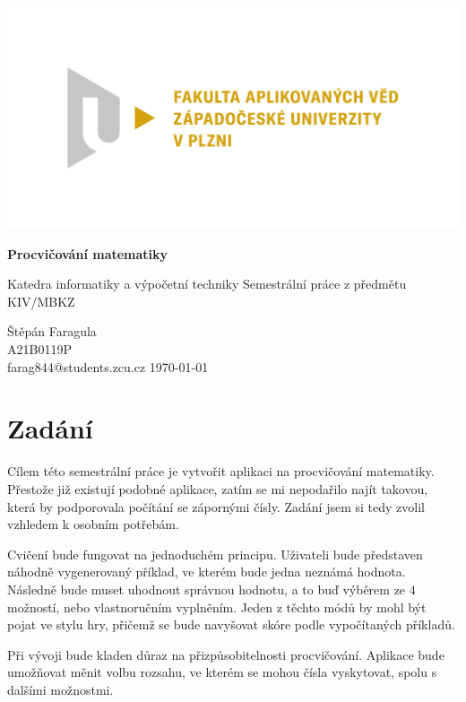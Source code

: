 \documentclass[12pt]{report}
\begin{document}
	\begin{titlepage}
		\centering
		\Large
		
		\includegraphics[width=.7\textwidth]{fav}
		
		\vspace{15mm}
		{\Huge\bfseries Procvičování matematiky}

		\vspace{5mm}
		{\LARGE Katedra informatiky a výpočetní techniky}
		{\LARGE Semestrální práce z předmětu KIV/MBKZ}
		
		\vfill
		\raggedright
		Štěpán Faragula\\
		A21B0119P\\
		farag844@students.zcu.cz
		\hfill 
		\today
	\end{titlepage}

	
	\tableofcontents


	\chapter{Zadání}
	Cílem této semestrální práce je vytvořit aplikaci na procvičování matematiky. Přestože již existují podobné aplikace, zatím se mi nepodařilo najít takovou, která by podporovala počítání se zápornými čísly. Zadání jsem si tedy zvolil vzhledem k osobním potřebám.
	
	Cvičení bude fungovat na jednoduchém principu. Uživateli bude představen náhodně vygenerovaný příklad, ve kterém bude jedna neznámá hodnota. Následně bude muset uhodnout správnou hodnotu, a to buď výběrem ze 4 možností, nebo vlastnoručním vyplněním. Jeden z těchto módů by mohl být pojat ve stylu hry, přičemž se bude navyšovat skóre podle vypočítaných příkladů. 
	
	Při vývoji bude kladen důraz na přizpůsobitelnosti procvičování. Aplikace bude umožňovat měnit volbu rozsahu, ve kterém se mohou čísla vyskytovat, spolu s dalšími možnostmi.
\end{document}

